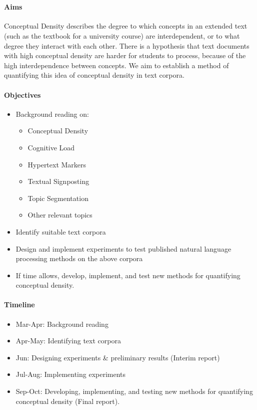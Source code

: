 \documentclass[12pt]{article}
\begin{document}
 \\

\paragraph{Aims}
Conceptual Density describes the degree to which concepts in an extended text (such as the textbook for a university course) are interdependent, or to what degree they interact with each other. There is a hypothesis that text documents with high conceptual density are harder for students to process, because of the high interdependence between concepts. We aim to establish a method of quantifying this idea of conceptual density in text corpora.

\paragraph{Objectives}
\begin{itemize}[noitemsep]
\item Background reading on: 

	\begin{itemize}[noitemsep]
		\item Conceptual Density
		\item Cognitive Load
		\item Hypertext Markers
		\item Textual Signposting
		\item Topic Segmentation
		\item Other relevant topics
	\end{itemize}

\item Identify suitable text corpora
\item Design and implement experiments to test published natural language processing methods on the above corpora
\item If time allows, develop, implement, and test new methods for quantifying conceptual density.
\end{itemize}

\paragraph{Timeline} 
\begin{itemize}[noitemsep]
\item Mar-Apr: Background reading
\item Apr-May: Identifying text corpora
\item Jun: Designing experiments \& preliminary results (Interim report)
\item Jul-Aug: Implementing experiments
\item Sep-Oct: Developing, implementing, and testing new methods for quantifying conceptual density (Final report).
\end{itemize}
\end{document}
